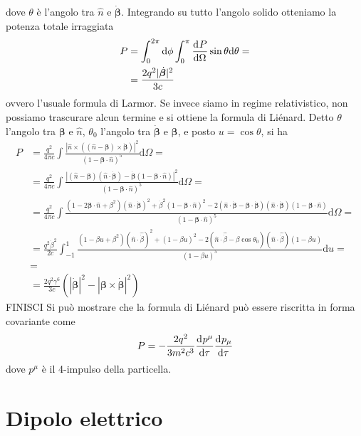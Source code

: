 \documentclass[a4paper,11pt]{article}
\renewcommand{\d}{\mathrm{d}}
\begin{document}
dove $\theta$ è l'angolo tra $\hat{n}$ e $\dot{\bm{\beta}}$. Integrando su tutto l'angolo solido otteniamo la potenza totale irraggiata
\begin{align*}
P&=\int_{0}^{2\pi}\d\phi\int_{0}^{\pi}\der{P}{\Omega}\sin\theta\d\theta=\\&=\frac{2q^2|\dot{\bm{\beta}}|^2}{3c}
\end{align*}
ovvero l'usuale formula di Larmor. Se invece siamo in regime relativistico, non possiamo trascurare alcun termine e si ottiene la formula di Liénard. Detto $\theta$ l'angolo tra $\bm{\beta}$ e $\hat{n}$, $\theta_0$ l'angolo tra $\dot{\bm{\beta}}$ e $\bm{\beta}$, e posto $u=\cos\theta$, si ha
\begin{align*}P&=\frac{q^2}{4\pi c}\int\frac{|\hat n\times((\hat{n}-\bm{\beta})\times\dot{\bm{\beta}})|^2}{(1-\bm{\beta}\cdot\hat{n})^5}\d\Omega=\\&=\frac{q^2}{4\pi c}\int\frac{|(\hat{n}-\bm{\beta})(\hat{n}\cdot\dot{\bm{\beta}})-\dot{\bm{\beta}}(1-\bm{\beta}\cdot\hat{n})|^2}{(1-\bm{\beta}\cdot\hat{n})^5}\d\Omega=
\\&=\frac{q^2}{4\pi c}\int\frac{(1-2\bm{\beta}\cdot\hat{n}+\beta^2)(\hat{n}\cdot\dot{\bm{\beta}})^2+\dot{\beta}^2(1-\bm{\beta}\cdot\hat{n})^2-2(\hat{n}\cdot\dot{\bm{\beta}}-\bm{\beta}\cdot\dot{\bm{\beta}})(\hat{n}\cdot\dot{\bm{\beta}})(1-\bm{\beta}\cdot\hat{n})}{(1-\bm{\beta}\cdot\hat{n})^5}\d\Omega=
\\&=\frac{q^2\dot{\beta}^2}{2c}\int_{-1}^{1}\frac{(1-\beta u+\beta^2)(\hat{n}\cdot\hat{\dot{\beta}})^2+(1-\beta u)^2-2(\hat{n}\cdot\hat{\dot{\beta}}-\beta\cos\theta_0)(\hat{n}\cdot\hat{\dot{\beta}})(1-\beta u)}{(1-\beta u)^5}\d u=
\\&=
\\&=\frac{2q^2\gamma^6}{3c}\left(|\dot{\bm{\beta}}|^2-|\bm{\beta}\times\dot{\bm{\beta}}|^2\right)\end{align*}FINISCI
Si può mostrare che la formula di Liénard può essere riscritta in forma covariante come
\[P=-\frac{2q^2}{3m^2c^3}\der{p^\mu}{\tau}\der{p_\mu}{\tau}\]
dove $p^\mu$ è il 4-impulso della particella.
\vspace{10 mm}
\section{Dipolo elettrico}
\end{document}
